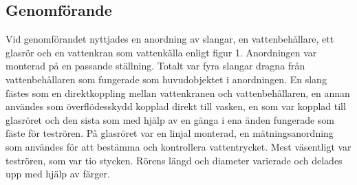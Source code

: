 \documentclass[a4paper,12pt]{article}
\begin{document}
\subsection{Genomförande}
    Vid genomförandet nyttjades en anordning av slangar, en vattenbehållare, ett glasrör och en vattenkran som vattenkälla enligt figur 1. Anordningen var monterad på en passande ställning. Totalt var fyra slangar dragna från vattenbehållaren som fungerade som huvudobjektet i anordningen. En slang fästes som en direktkoppling mellan vattenkranen och vattenbehållaren, en annan användes som överflödesskydd kopplad direkt till vasken, en som var kopplad till glasröret och den sista som med hjälp av en gänga i ena änden fungerade som fäste för teströren. På glasröret var en linjal monterad, en mätningsanordning som användes för att bestämma och kontrollera vattentrycket. Mest väsentligt var teströren, som var tio stycken. Rörens längd och diameter varierade och delades upp med hjälp av färger.
\end{document}
